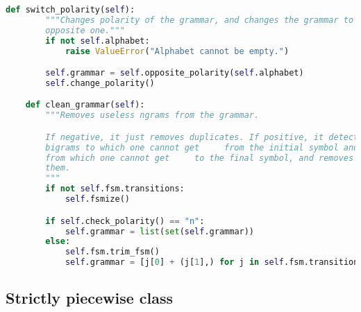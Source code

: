 \begin{lstlisting}[language=Python]
    def switch_polarity(self):
        """Changes polarity of the grammar, and changes the grammar to the
        opposite one."""
        if not self.alphabet:
            raise ValueError("Alphabet cannot be empty.")

        self.grammar = self.opposite_polarity(self.alphabet)
        self.change_polarity()

    def clean_grammar(self):
        """Removes useless ngrams from the grammar.

        If negative, it just removes duplicates. If positive, it detects
        bigrams to which one cannot get     from the initial symbol and
        from which one cannot get     to the final symbol, and removes
        them.
        """
        if not self.fsm.transitions:
            self.fsmize()

        if self.check_polarity() == "n":
            self.grammar = list(set(self.grammar))
        else:
            self.fsm.trim_fsm()
            self.grammar = [j[0] + (j[1],) for j in self.fsm.transitions]
\end{lstlisting}


\subsection*{Strictly piecewise class}

